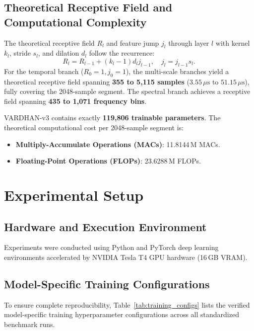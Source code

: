 \documentclass[journal,10pt,twocolumn]{IEEEtran}
\begin{document}
\subsection{Theoretical Receptive Field and Computational Complexity}
The theoretical receptive field $R_l$ and feature jump $j_l$ through layer $l$ with kernel $k_l$, stride $s_l$, and dilation $d_l$ follow the recurrence:
\begin{equation}
R_l = R_{l-1} + (k_l - 1) d_l j_{l-1}, \quad j_l = j_{l-1} s_l.
\label{eq:rf_recurrence}
\end{equation}
For the temporal branch ($R_0=1, j_0=1$), the multi-scale branches yield a theoretical receptive field spanning \textbf{355 to 5,115 samples} ($3.55\,\mu\text{s}$ to $51.15\,\mu\text{s}$), fully covering the 2048-sample segment. The spectral branch achieves a receptive field spanning \textbf{435 to 1,071 frequency bins}.

VARDHAN-v3 contains exactly \textbf{119,806 trainable parameters}. The theoretical computational cost per 2048-sample segment is:
\begin{itemize}
    \item \textbf{Multiply-Accumulate Operations (MACs)}: 11.8144\,M MACs.
    \item \textbf{Floating-Point Operations (FLOPs)}: 23.6288\,M FLOPs.
\end{itemize}

\section{Experimental Setup}
\subsection{Hardware and Execution Environment}
Experiments were conducted using Python and PyTorch deep learning environments accelerated by NVIDIA Tesla T4 GPU hardware (16\,GB VRAM).

\subsection{Model-Specific Training Configurations}
To ensure complete reproducibility, Table~\ref{tab:training_configs} lists the verified model-specific training hyperparameter configurations across all standardized benchmark runs.
\end{document}
